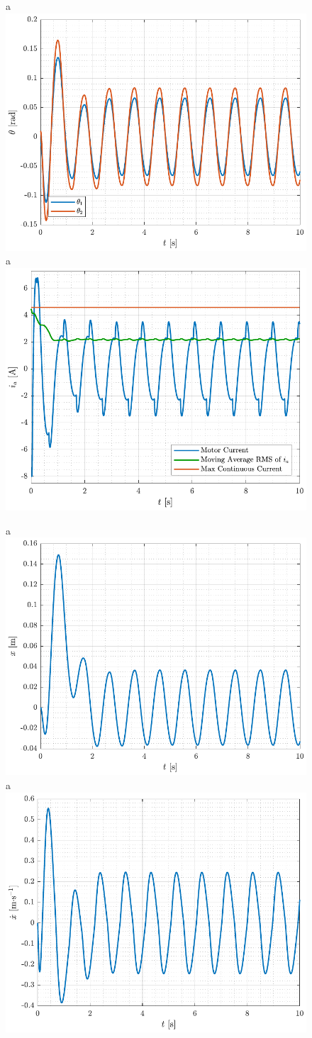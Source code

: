 \begin{figure}[H]
  \hspace{-10pt}
  \captionbox
  {
    a
    \label{fig:theta_twinStabilize}
  }
  {
    \hspace{-1cm}
    \includegraphics[width=.4\textwidth]{figures/theta_twinStabilize}
  }
  \hspace{20pt}
  \captionbox 
  {
    a
    \label{fig:ia_twinStabilize}
  }
  {
    \hspace{-1cm}
    \includegraphics[width=.4\textwidth]{figures/ia_twinStabilize}
  }  
\end{figure}
%
\begin{figure}[H]
  \hspace{-10pt}
  \captionbox
  {
    a
    \label{fig:x_twinStabilize}
  }
  {
    \hspace{-1cm}
    \includegraphics[width=.4\textwidth]{figures/x_twinStabilize}
  }
  \hspace{20pt}
  \captionbox 
  {
    a
    \label{fig:xDot_twinStabilize}
  }
  {
    \hspace{-1cm}
    \includegraphics[width=.4\textwidth]{figures/xDot_twinStabilize}
  }  
\end{figure}
